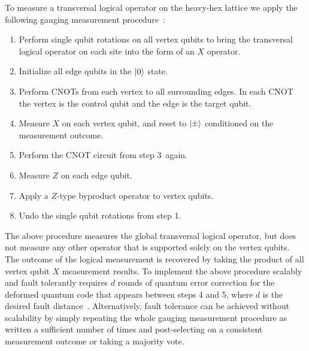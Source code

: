 To measure a transversal logical operator on the heavy-hex lattice we apply the following gauging measurement procedure~\cite{williamsonLowoverheadFaulttolerantQuantum2024}: 
\begin{enumerate}
    \item Perform single qubit rotations on all vertex qubits to bring the transversal logical operator on each site into the form of an $X$ operator.
    \item Initialize all edge qubits in the $\ket{0}$ state. 
    \item Perform CNOTs from each vertex to all surrounding edges. In each CNOT the vertex is the control qubit and the edge is the target qubit.
    \item Measure $X$ on each vertex qubit, and reset to $\ket{\pm}$ conditioned on the measurement outcome.
    \item Perform the CNOT circuit from step 3~again.
    \item Measure $Z$ on each edge qubit. 
    \item Apply a $Z$-type byproduct operator to vertex qubits. 
    \item Undo the single qubit rotations from step 1.
\end{enumerate} 
The above procedure measures the global transversal logical operator, but does not measure any other operator that is supported solely on the vertex qubits. 
The outcome of the logical measurement is recovered by taking the product of all vertex qubit $X$ measurement results. 
To implement the above procedure scalably and fault tolerantly requires $d$ rounds of quantum error correction for the deformed quantum code that appears between steps 4 and 5, where $d$ is the desired fault distance~\cite{williamsonLowoverheadFaulttolerantQuantum2024}. 
Alternatively, fault tolerance can be achieved without scalability by simply repeating the whole gauging measurement procedure as written a sufficient number of times and post-selecting on a consistent measurement outcome or taking a majority vote. 


